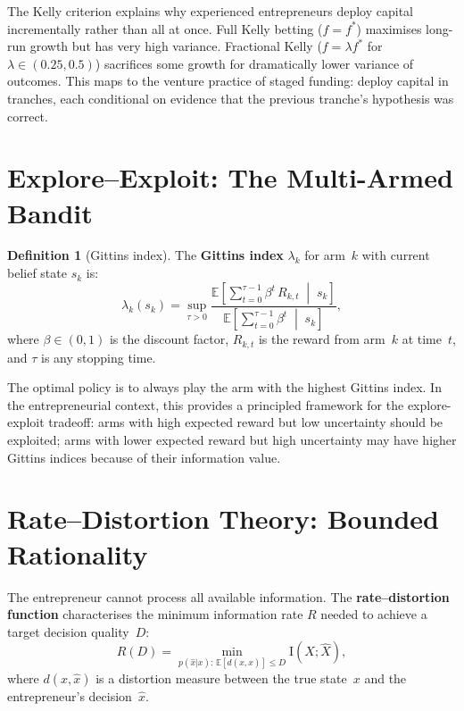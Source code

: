 \documentclass[12pt,a4paper,oneside]{book}
\theoremstyle{definition}
\newtheorem{definition}[theorem]{Definition}
\theoremstyle{remark}
\newcommand{\E}{\mathbb{E}}
\newcommand{\MI}{\mathrm{I}}
\begin{document}
\begin{practicalimplication}
The Kelly criterion explains why experienced entrepreneurs deploy capital incrementally
rather than all at once. Full Kelly betting ($f = f^*$) maximises long-run growth but
has very high variance. Fractional Kelly ($f = \lambda f^*$ for $\lambda \in (0.25, 0.5)$)
sacrifices some growth for dramatically lower variance of outcomes. This maps to the
venture practice of staged funding: deploy capital in tranches, each conditional on
evidence that the previous tranche's hypothesis was correct.
\end{practicalimplication}

\section{Explore--Exploit: The Multi-Armed Bandit}

\begin{definition}[Gittins index]
The \textbf{Gittins index} $\lambda_k$ for arm~$k$ with current belief
state $s_k$ is:
\begin{equation}\label{eq:gittins}
  \lambda_k(s_k) = \sup_{\tau > 0}
    \frac{\E\!\left[\sum_{t=0}^{\tau-1} \beta^t\,R_{k,t}
      \;\middle|\; s_k\right]}
    {\E\!\left[\sum_{t=0}^{\tau-1} \beta^t
      \;\middle|\; s_k\right]},
\end{equation}
where $\beta \in (0,1)$ is the discount factor, $R_{k,t}$ is the reward
from arm~$k$ at time~$t$, and $\tau$ is any stopping time.
\end{definition}

The optimal policy is to always play the arm with the highest Gittins index. In the
entrepreneurial context, this provides a principled framework for the explore-exploit
tradeoff: arms with high expected reward but low uncertainty should be exploited; arms
with lower expected reward but high uncertainty may have higher Gittins indices because
of their information value.

\section{Rate--Distortion Theory: Bounded Rationality}

The entrepreneur cannot process all available information. The
\textbf{rate--distortion function} \citep{CoverThomas2006} characterises the
minimum information rate $R$ needed to achieve a target decision quality~$D$:
\begin{equation}\label{eq:rate_distortion}
  R(D) = \min_{p(\hat{x}|x):\, \E[d(x,\hat{x})] \leq D}
    \MI(X; \hat{X}),
\end{equation}
where $d(x, \hat{x})$ is a distortion measure between the true state~$x$
and the entrepreneur's decision~$\hat{x}$.
\end{document}
